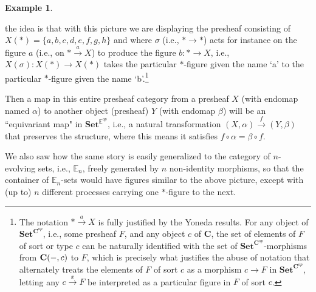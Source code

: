 \documentclass[a4paper]{book}
\theoremstyle{definition}
\newtheorem{example}{Example}[section]
\theoremstyle{definition}
\theoremstyle{definition}
\theoremstyle{theorem}
\theoremstyle{definition}
\begin{document}
\begin{example}
\begin{center}
 \end{center}
		the idea is that with this picture we are displaying the presheaf consisting of $X(*) = \{a,b,c,d,e,f,g,h \}$ and where $\sigma$ (i.e., $* \rightarrow *$) acts for instance on the figure $a$ (i.e., on $* \xrightarrow{a} X$) to produce the figure $b: * \rightarrow X$, i.e., $X(\sigma): X(*) \rightarrow X(*)$ takes the particular $*$-figure given the name `a' to the particular $*$-figure given the name `b'.\footnote{The notation $* \xrightarrow{a} X$ is fully justified by the Yoneda results. For any object of $\textbf{Set}^{\textbf{C}^{op}}$, i.e., some presheaf $F$, and any object $c$ of $\textbf{C}$, the set of elements of $F$ of sort or type $c$ can be naturally identified with the set of $\textbf{Set}^{\textbf{C}^{op}}$-morphisms from $\textbf{C}(\--, c)$ to $F$, which is precisely what justifies the abuse of notation that alternately treats the elements of $F$ of sort $c$ as a morphism $c \rightarrow F$ in $\textbf{Set}^{\textbf{C}^{op}}$, letting any $c \xrightarrow{x} F$ be interpreted as a particular figure in $F$ of sort $c$.} \par
		Then a map in this entire presheaf category from a presheaf $X$ (with endomap named $\alpha$) to another object (presheaf) $Y$ (with endomap $\beta$) will be an ``equivariant map" in $\textbf{Set}^{\mathbb{E}^{op}}$, i.e., a natural transformation $(X, \alpha) \xrightarrow{f} (Y, \beta)$ that preserves the structure, where this means it satisfies $f \circ \alpha = \beta \circ f$. \par  
		We also saw how the same story is easily generalized to the category of $n$-evolving sets, i.e., $\mathbb{E}_n$, freely generated by $n$ non-identity morphisms, so that the container of $\mathbb{E}_n$-sets would have figures similar to the above picture, except with (up to) $n$ different processes carrying one $*$-figure to the next. \par 

\end{example}
\end{document}
